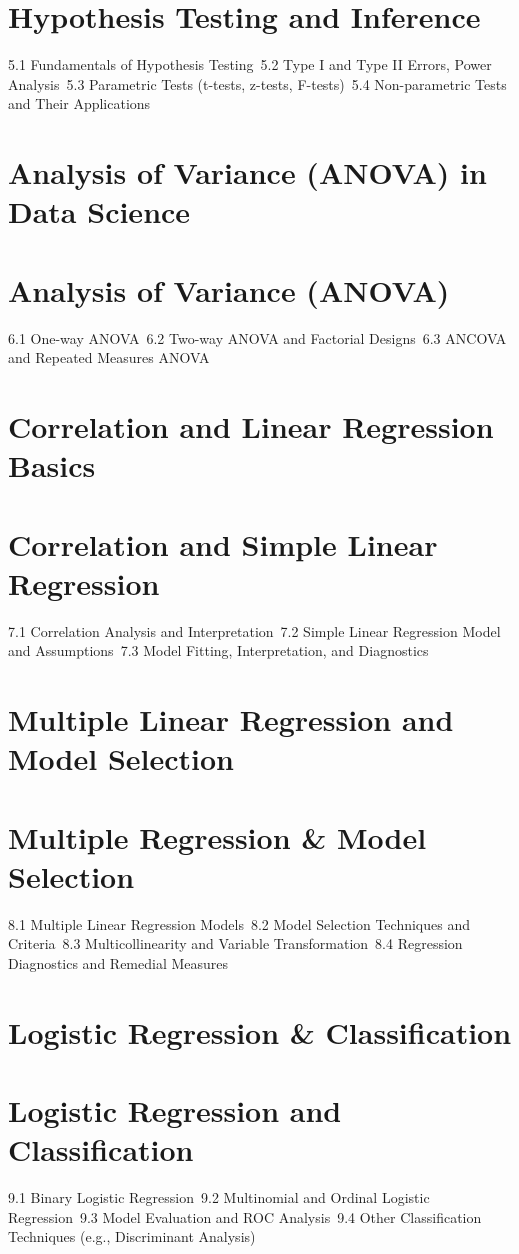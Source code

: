 \section{Hypothesis Testing and Inference}
5.1 Fundamentals of Hypothesis Testing\
5.2 Type I and Type II Errors, Power Analysis\
5.3 Parametric Tests (t-tests, z-tests, F-tests)\
5.4 Non-parametric Tests and Their Applications\
\section{Analysis of Variance (ANOVA) in Data Science}
\section{Analysis of Variance (ANOVA)}
6.1 One-way ANOVA\
6.2 Two-way ANOVA and Factorial Designs\
6.3 ANCOVA and Repeated Measures ANOVA\
\section{Correlation and Linear Regression Basics}
\section{Correlation and Simple Linear Regression}
7.1 Correlation Analysis and Interpretation\
7.2 Simple Linear Regression Model and Assumptions\
7.3 Model Fitting, Interpretation, and Diagnostics\
\section{Multiple Linear Regression and Model Selection}
\section{Multiple Regression \& Model Selection}
8.1 Multiple Linear Regression Models\
8.2 Model Selection Techniques and Criteria\
8.3 Multicollinearity and Variable Transformation\
8.4 Regression Diagnostics and Remedial Measures\
\section{Logistic Regression \& Classification}
\section{Logistic Regression and Classification}
9.1 Binary Logistic Regression\
9.2 Multinomial and Ordinal Logistic Regression\
9.3 Model Evaluation and ROC Analysis\
9.4 Other Classification Techniques (e.g., Discriminant Analysis)\
